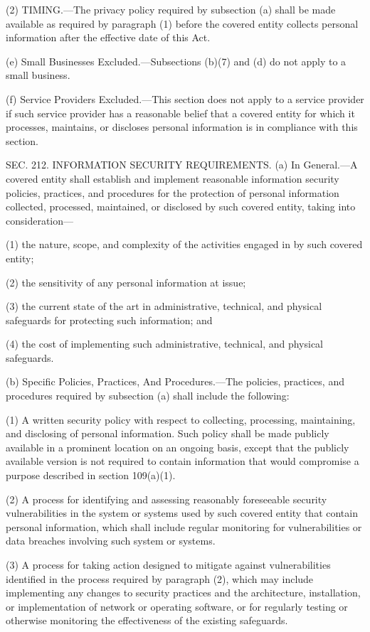 (2) TIMING.—The privacy policy required by subsection (a) shall be made available as required by paragraph (1) before the covered entity collects personal information after the effective date of this Act.

(e) Small Businesses Excluded.—Subsections (b)(7) and (d) do not apply to a small business.

(f) Service Providers Excluded.—This section does not apply to a service provider if such service provider has a reasonable belief that a covered entity for which it processes, maintains, or discloses personal information is in compliance with this section.


SEC. 212. INFORMATION SECURITY REQUIREMENTS.
(a) In General.—A covered entity shall establish and implement reasonable information security policies, practices, and procedures for the protection of personal information collected, processed, maintained, or disclosed by such covered entity, taking into consideration—

(1) the nature, scope, and complexity of the activities engaged in by such covered entity;

(2) the sensitivity of any personal information at issue;

(3) the current state of the art in administrative, technical, and physical safeguards for protecting such information; and

(4) the cost of implementing such administrative, technical, and physical safeguards.

(b) Specific Policies, Practices, And Procedures.—The policies, practices, and procedures required by subsection (a) shall include the following:

(1) A written security policy with respect to collecting, processing, maintaining, and disclosing of personal information. Such policy shall be made publicly available in a prominent location on an ongoing basis, except that the publicly available version is not required to contain information that would compromise a purpose described in section 109(a)(1).

(2) A process for identifying and assessing reasonably foreseeable security vulnerabilities in the system or systems used by such covered entity that contain personal information, which shall include regular monitoring for vulnerabilities or data breaches involving such system or systems.

(3) A process for taking action designed to mitigate against vulnerabilities identified in the process required by paragraph (2), which may include implementing any changes to security practices and the architecture, installation, or implementation of network or operating software, or for regularly testing or otherwise monitoring the effectiveness of the existing safeguards.

